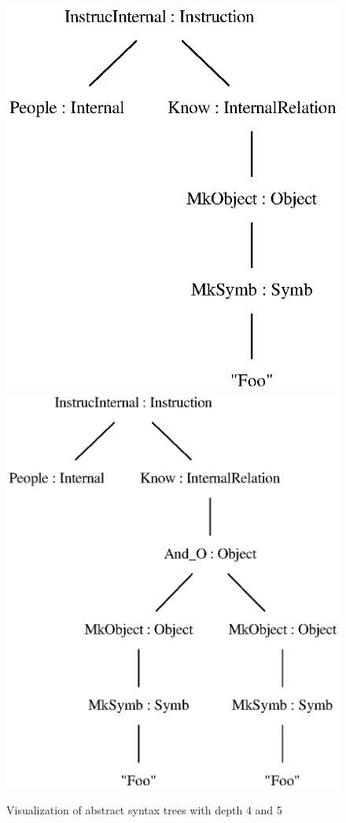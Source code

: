 \begin{figure}[H]
\includegraphics[scale=0.6,keepaspectratio,valign=t]{./gfx/depth4}
\includegraphics[scale=0.6,keepaspectratio,valign=t]{./gfx/depth5}
\caption{Visualization of abstract syntax trees with depth 4 and 5\label{fig:asts-depths2}}
\end{figure}

